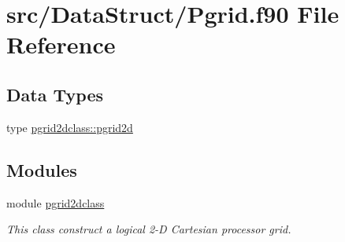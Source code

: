 \hypertarget{_pgrid_8f90}{}\section{src/\+Data\+Struct/\+Pgrid.f90 File Reference}
\label{_pgrid_8f90}
\subsection*{Data Types}
\begin{DoxyCompactItemize}
\item 
type \mbox{\hyperlink{namespacepgrid2dclass_structpgrid2dclass_1_1pgrid2d}{pgrid2dclass\+::pgrid2d}}
\end{DoxyCompactItemize}
\subsection*{Modules}
\begin{DoxyCompactItemize}
\item 
module \mbox{\hyperlink{namespacepgrid2dclass}{pgrid2dclass}}
\begin{DoxyCompactList}\small\item\em This class construct a logical 2-\/D Cartesian processor grid. \end{DoxyCompactList}\end{DoxyCompactItemize}
